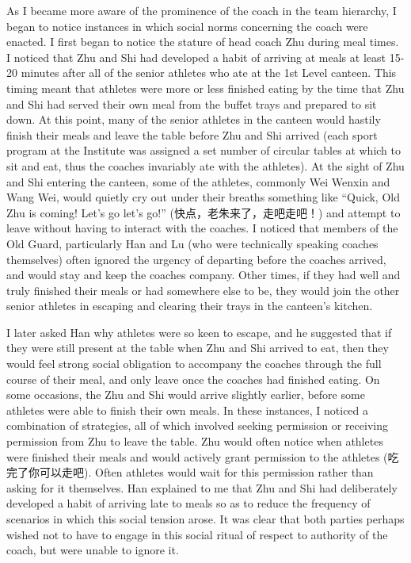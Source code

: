   As I became more aware of the prominence of the coach in the team hierarchy, I began to notice instances in which social norms concerning the coach were enacted.  I first began to notice the stature of head coach Zhu during meal times.  I noticed that Zhu and Shi had developed a habit of arriving at meals at least 15-20 minutes after all of the senior athletes who ate at the 1st Level canteen.  This timing meant that athletes were more or less finished eating by the time that Zhu and Shi had served their own meal from the buffet trays and prepared to sit down.  At this point, many of the senior athletes in the canteen would hastily finish their meals and leave the table before Zhu and Shi arrived (each sport program at the Institute was assigned a set number of circular tables at which to sit and eat, thus the coaches invariably ate with the athletes). At the sight of Zhu and Shi entering the canteen, some of the athletes, commonly Wei Wenxin and Wang Wei, would quietly cry out under their breaths something like ``Quick, Old Zhu is coming!  Let's go let's go!'' (快点，老朱来了，走吧走吧！) and attempt to leave without having to interact with the coaches.  I noticed that members of the Old Guard, particularly Han and Lu (who were technically speaking coaches themselves) often ignored the urgency of departing before the coaches arrived, and would stay and keep the coaches company. Other times, if they had well and truly finished their meals or had somewhere else to be, they would join the other senior athletes in escaping and clearing their trays in the canteen's kitchen.

  I later asked Han why athletes were so keen to escape, and he suggested that if they were still present at the table when Zhu and Shi arrived to eat, then they would feel strong social obligation to accompany the coaches through the full course of their meal, and only leave once the coaches had finished eating.  On some occasions, the Zhu and Shi would arrive slightly earlier, before some athletes were able to finish their own meals.  In these instances, I noticed a combination of strategies, all of which involved seeking permission or receiving permission from Zhu to leave the table.  Zhu would often notice when athletes were finished their meals and would actively grant permission to the athletes (吃完了你可以走吧).  Often athletes would wait for this permission rather than asking for it themselves.  Han explained to me that Zhu and Shi had deliberately developed a habit of arriving late to meals so as to reduce the frequency of scenarios in which this social tension arose.  It was clear that both parties perhaps wished not to have to engage in this social ritual of respect to authority of the coach, but were unable to ignore it.

